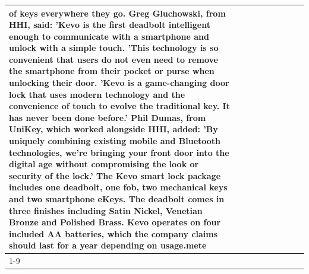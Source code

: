 \begin{table}[H]
\begin{tabular}{lllrlllll}
of keys everywhere they go. Greg Gluchowski, from HHI, said: 'Kevo is the first deadbolt intelligent enough to communicate with a smartphone and unlock with a simple touch. 'This technology is so convenient that users do not even need to remove the smartphone from their pocket or purse when unlocking their door. 'Kevo is a game-changing door lock that uses modern technology and the convenience of touch to evolve the traditional key. It has never been done before.' Phil Dumas, from UniKey, which worked alongside HHI, added: 'By uniquely combining existing mobile and Bluetooth technologies, we’re bringing your front door into the digital age without compromising the look or security of the lock.' The Kevo smart lock package includes one deadbolt, one fob, two mechanical keys and two smartphone eKeys. The deadbolt comes in three finishes including Satin Nickel, Venetian Bronze and Polished Brass. Kevo operates on four included AA batteries, which the company claims should last for a year depending on usage.mete \\
\cline{1-9}

\end{tabular}
\end{table}
